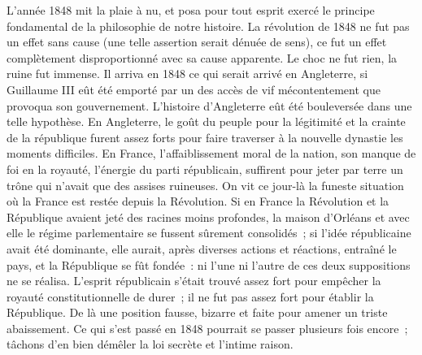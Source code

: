 \documentclass[french,twoside]{book} %
\begin{document}
L’année 1848 mit la plaie à nu, et posa pour tout esprit exercé le principe fondamental de la philosophie de notre histoire. La révolution de 1848 ne fut pas un effet sans cause (une telle assertion serait dénuée de sens), ce fut un effet complètement disproportionné avec sa cause apparente. Le choc ne fut rien, la ruine fut immense. Il arriva en 1848 ce qui serait arrivé en Angleterre, si Guillaume III eût été emporté par un des accès de vif mécontentement que provoqua son gouvernement. L’histoire d’Angleterre eût été bouleversée dans une telle hypothèse. En Angleterre, le goût du peuple pour la légitimité et la crainte de la république furent assez forts pour faire traverser à la nouvelle dynastie les moments difficiles. En France, l’affaiblissement moral de la nation, son manque de foi en la royauté, l’énergie du parti républicain, suffirent pour jeter par terre un trône qui n’avait que des assises ruineuses. On vit ce jour-là la funeste situation où la France est restée depuis la Révolution. Si en France la Révolution et la République avaient jeté des racines moins profondes, la maison d’Orléans et avec elle le régime parlementaire se fussent sûrement consolidés ; si l’idée républicaine avait été dominante, elle aurait, après diverses actions et réactions, entraîné le pays, et la République se fût fondée : ni l’une ni l’autre de ces deux suppositions ne se réalisa. L’esprit républicain s’était trouvé assez fort pour empêcher la royauté constitutionnelle de durer ; il ne fut pas assez fort pour établir la République. De là une position fausse, bizarre et faite pour amener un triste abaissement. Ce qui s’est passé en 1848 pourrait se passer plusieurs fois encore ; tâchons d’en bien démêler la loi secrète et l’intime raison.\par
\end{document}
